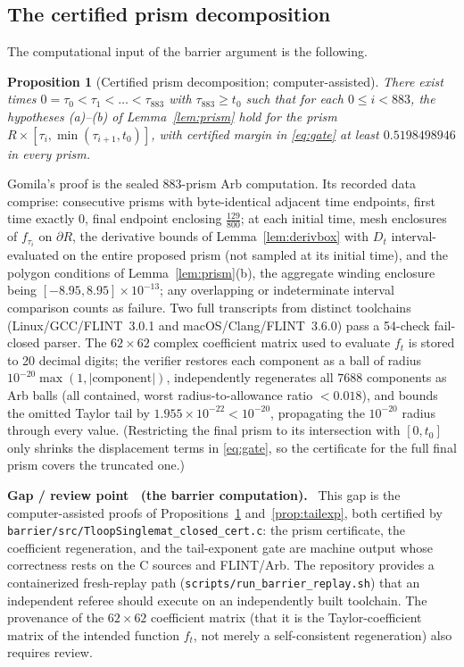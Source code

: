 \documentclass[11pt]{article}
\newtheorem{proposition}[theorem]{Proposition}
\theoremstyle{definition}
\newcounter{gapctr}
\newenvironment{gap}[1]{%
  \refstepcounter{gapctr}%
  \def\FrameCommand{\fboxsep=8pt\fcolorbox{gapred}{gapbg}}%
  \begin{framed}\noindent\textbf{\color{gapred}Gap / review point \thegapctr\ (#1).}\ }%
  {\end{framed}}
\begin{document}
\subsection{The certified prism decomposition}\label{sec:prismcert}

The computational input of the barrier argument is the following.

\begin{proposition}[Certified prism decomposition;
computer-assisted]\label{prop:prismcert}
There exist times $0=\tau_0<\tau_1<\dots<\tau_{883}$ with
$\tau_{883}\ge t_0$ such that for each $0\le i<883$, the
hypotheses (a)--(b) of Lemma~\ref{lem:prism} hold for the prism
$R\times[\tau_i,\min(\tau_{i+1},t_0)]$, with certified margin in
\eqref{eq:gate} at least $0.5198498946$ in every prism.
\end{proposition}

Gomila's proof is the sealed $883$-prism Arb computation. Its
recorded data comprise: consecutive prisms with byte-identical
adjacent time endpoints, first time exactly $0$, final endpoint
enclosing $\frac{129}{800}$; at each initial time, mesh enclosures
of $f_{\tau_i}$ on $\partial R$, the derivative bounds of
Lemma~\ref{lem:derivbox} with $D_t$ interval-evaluated on the entire
proposed prism (not sampled at its initial time), and the polygon
conditions of Lemma~\ref{lem:prism}(b), the aggregate winding
enclosure being $[-8.95,8.95]\times10^{-13}$; any overlapping or
indeterminate interval comparison counts as failure. Two full
transcripts from distinct toolchains (Linux/GCC/FLINT~3.0.1 and
macOS/Clang/FLINT~3.6.0) pass a 54-check fail-closed parser. The
$62\times62$ complex coefficient matrix used to evaluate $f_t$ is
stored to 20 decimal digits; the verifier restores each component as
a ball of radius $10^{-20}\max(1,|\text{component}|)$, independently
regenerates all $7688$ components as Arb balls (all contained, worst
radius-to-allowance ratio $<0.018$), and bounds the omitted Taylor
tail by $1.955\times10^{-22}<10^{-20}$, propagating the $10^{-20}$
radius through every value. (Restricting the final prism to its
intersection with $[0,t_0]$ only shrinks the displacement terms in
\eqref{eq:gate}, so the certificate for the full final prism covers
the truncated one.)

\begin{gap}{the barrier computation}
\label{gap:barriercomp}
This gap is the computer-assisted proofs of
Propositions~\ref{prop:prismcert} and~\ref{prop:tailexp}, both
certified by \texttt{barrier/src/TloopSinglemat\_closed\_cert.c}:
the prism certificate, the coefficient regeneration, and the
tail-exponent gate are machine output whose correctness rests on
the C sources and FLINT/Arb. The repository provides a containerized fresh-replay path
(\texttt{scripts/run\_barrier\_replay.sh}) that an independent
referee should execute on an independently built toolchain. The
provenance of the $62\times62$ coefficient matrix (that it is the
Taylor-coefficient matrix of the intended function $f_t$, not merely
a self-consistent regeneration) also requires review.
\end{gap}
\end{document}
